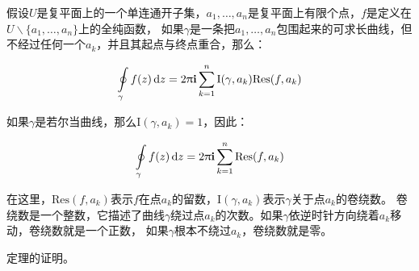 	假设$U$是复平面上的一个单连通开子集，$a_1,\ldots,a_n$是复平面上有限个点，$f$是定义在$U\backslash\{a_1,\ldots,a_n\}$上的全纯函数，
	如果$\gamma$是一条把$a_1,\ldots,a_n$包围起来的可求长曲线，但不经过任何一个$a_k$，并且其起点与终点重合，那么：
	
	\begin{equation}
	\label{eq:res}
	\ointop_{\gamma}f(z)\,\mathrm{d}z=2\uppi\mathbf{i}\sum^n_{k=1}\mathrm{I}(\gamma,a_k)\mathrm{Res}(f,a_k)
	\end{equation}
	
	如果$\gamma$是若尔当曲线，那么$\mathrm{I}(\gamma,a_k)=1$，因此：
	
	\begin{equation}
	\label{eq:resthm}
	\ointop_{\gamma}f(z)\,\mathrm{d}z=2\uppi\mathbf{i}\sum^n_{k=1}\mathrm{Res}(f,a_k)
	\end{equation}
	
	
	在这里，$\mathrm{Res}(f,a_k)$表示$f$在点$a_k$的留数，$\mathrm{I}(\gamma,a_k)$表示$\gamma$关于点$a_k$的卷绕数。
	卷绕数是一个整数，它描述了曲线$\gamma$绕过点$a_k$的次数。如果$\gamma$依逆时针方向绕着$a_k$移动，卷绕数就是一个正数，
	如果$\gamma$根本不绕过$a_k$，卷绕数就是零。
	
	定理的证明。
	
%		
%		

\zhlipsum[6-20][name=zhufu]

\zhlipsum[21-40][name=zhufu]

\zhlipsum[41-70][name=zhufu]
